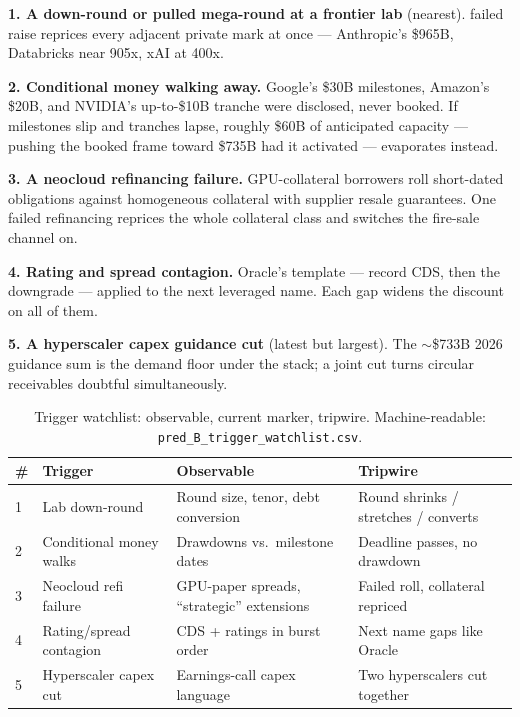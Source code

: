 \documentclass[11pt,a4paper]{article}
\begin{document}
\textbf{1. A down-round or pulled mega-round at a frontier lab} (nearest).
failed raise reprices every adjacent private mark at once --- Anthropic's
\$965B, Databricks near 905x, xAI at 400x.

\textbf{2. Conditional money walking away.} Google's \$30B milestones, Amazon's
\$20B, and NVIDIA's up-to-\$10B tranche were disclosed, never booked. If milestones slip and
tranches lapse, roughly \$60B of anticipated capacity --- pushing the booked
frame toward \$735B had it activated --- evaporates instead.

\textbf{3. A neocloud refinancing failure.} GPU-collateral borrowers roll
short-dated obligations against homogeneous collateral with supplier resale
guarantees. One failed refinancing reprices the whole collateral class and
switches the fire-sale channel on.

\textbf{4. Rating and spread contagion.} Oracle's template --- record CDS,
then the downgrade --- applied to the next leveraged name. Each gap widens
the discount on all of them.

\textbf{5. A hyperscaler capex guidance cut} (latest but largest). The
$\sim$\$733B 2026 guidance sum is the demand floor under the stack; a joint
cut turns circular receivables doubtful simultaneously.

\begin{table}[htbp]
\centering
\caption{Trigger watchlist: observable, current marker, tripwire. Machine-readable: \texttt{pred\_B\_trigger\_watchlist.csv}.}
    \label{tab:13-trigger-watchlist-observable-current}
\begin{tabular}{l>{\raggedright\arraybackslash}p{3.2cm}>{\raggedright\arraybackslash}p{3.6cm}>{\raggedright\arraybackslash}p{3.6cm}}
\toprule
\# & Trigger & Observable & Tripwire \\
\midrule
1 & Lab down-round & Round size, tenor, debt conversion & Round shrinks / stretches / converts \\
2 & Conditional money walks & Drawdowns vs.\ milestone dates & Deadline passes, no drawdown \\
3 & Neocloud refi failure & GPU-paper spreads, ``strategic'' extensions & Failed roll, collateral repriced \\
4 & Rating/spread contagion & CDS + ratings in burst order & Next name gaps like Oracle \\
5 & Hyperscaler capex cut & Earnings-call capex language & Two hyperscalers cut together \\
\bottomrule
\end{tabular}
\end{table}
\end{document}

